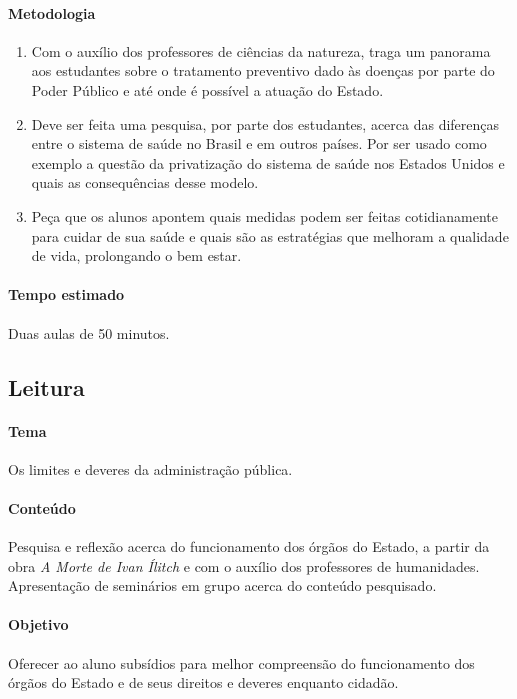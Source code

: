 \documentclass[12pt]{extarticle}
\begin{document}
\paragraph{Metodologia}

\begin{enumerate}

\item Com o auxílio dos professores de ciências da natureza, traga
um panorama aos estudantes sobre o tratamento preventivo dado às doenças
por parte do Poder Público e até onde é possível a atuação do Estado.

\item Deve ser feita uma pesquisa, por parte dos estudantes,
acerca das diferenças entre o sistema de saúde no Brasil e em outros países.
Por ser usado como exemplo a questão da privatização do sistema de saúde nos Estados Unidos
e quais as consequências desse modelo.

\item Peça que os alunos apontem quais medidas podem ser feitas cotidianamente
para cuidar de sua saúde e quais são as estratégias que melhoram a qualidade de vida, 
prolongando o bem estar.

\end{enumerate}

\paragraph{Tempo estimado} Duas aulas de 50 minutos.


\subsection{Leitura}

\paragraph{Tema} Os limites e deveres da administração pública.

\paragraph{Conteúdo} Pesquisa e reflexão acerca do funcionamento dos órgãos do Estado,
a partir da obra \emph{A Morte de Ivan Ílitch} e com o auxílio dos professores
de humanidades. Apresentação de seminários em grupo acerca do conteúdo pesquisado.

\paragraph{Objetivo} Oferecer ao aluno subsídios para melhor compreensão do
funcionamento dos órgãos do Estado e de seus direitos e deveres enquanto cidadão.
\end{document}
